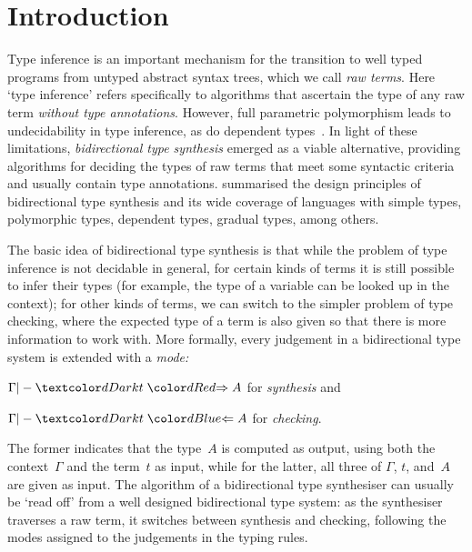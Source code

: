 
\section{Introduction}\label{sec:intro}

Type inference is an important mechanism for the transition to well typed programs from untyped abstract syntax trees, which we call \emph{raw terms}.
Here `type inference' refers specifically to algorithms that ascertain the type of any raw term \emph{without type annotations}.
However, full parametric polymorphism leads to undecidability in type inference, as do dependent types~\cite{Wells1999,Dowek1993}.
In light of these limitations, \emph{bidirectional type synthesis} emerged as a viable alternative, providing algorithms for deciding the types of raw terms that meet some syntactic criteria and usually contain type annotations.
 summarised the design principles of bidirectional type synthesis and its wide coverage of languages with simple types, polymorphic types, dependent types, gradual types, among others.

The basic idea of bidirectional type synthesis is that while the problem of type inference is not decidable in general, for certain kinds of terms it is still possible to infer their types (for example, the type of a variable can be looked up in the context); for other kinds of terms, we can switch to the simpler problem of type checking, where the expected type of a term is also given so that there is more information to work with.
More formally, every judgement in a bidirectional type system is extended with a \emph{mode:}
\begin{inlineenum}
  \item $\Gamma |- \isTerm{t} \syn A$ for \emph{synthesis} and 
  \item $\Gamma |- \isTerm{t} \chk A$ for \emph{checking}.
\end{inlineenum}
The former indicates that the type~$A$ is computed as output, using both the context~$\Gamma$ and the term~$t$ as input, while for the latter, all three of $\Gamma$, $t$, and~$A$ are given as input.
The algorithm of a bidirectional type synthesiser can usually be `read off' from a well designed bidirectional type system: as the synthesiser traverses a raw term, it switches between synthesis and checking, following the modes assigned to the judgements in the typing rules.

